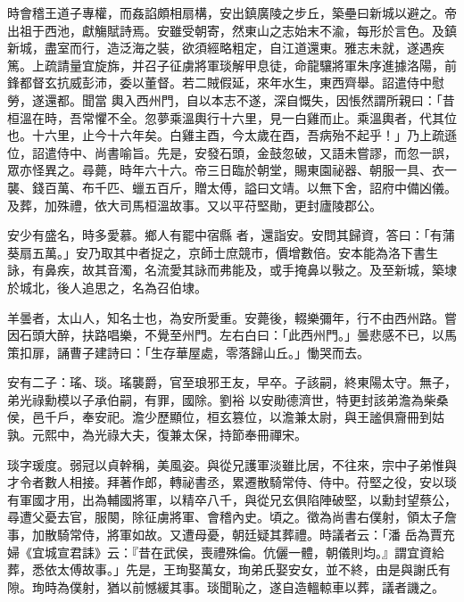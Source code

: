 \begin{pinyinscope}
 時會稽王道子專權，而姦諂頗相扇構，安出鎮廣陵之步丘，築壘曰新城以避之。帝出祖于西池，獻觴賦詩焉。安雖受朝寄，然東山之志始末不渝，每形於言色。及鎮新城，盡室而行，造泛海之裝，欲須經略粗定，自江道還東。雅志未就，遂遇疾篤。上疏請量宜旋旆，并召子征虜將軍琰解甲息徒，命龍驤將軍朱序進據洛陽，前鋒都督玄抗威彭沛，委以董督。若二賊假延，來年水生，東西齊舉。詔遣侍中慰勞，遂還都。聞當
 輿入西州門，自以本志不遂，深自慨失，因悵然謂所親曰：「昔桓溫在時，吾常懼不全。忽夢乘溫輿行十六里，見一白雞而止。乘溫輿者，代其位也。十六里，止今十六年矣。白雞主酉，今太歲在酉，吾病殆不起乎！」乃上疏遜位，詔遣侍中、尚書喻旨。先是，安發石頭，金鼓忽破，又語未嘗謬，而忽一誤，眾亦怪異之。尋薨，時年六十六。帝三日臨於朝堂，賜東園祕器、朝服一具、衣一襲、錢百萬、布千匹、蠟五百斤，贈太傅，謚曰文靖。以無下舍，詔府中備凶儀。及葬，加殊禮，依大司馬桓溫故事。又以平苻堅勛，更封廬陵郡公。



 安少有盛名，時多愛慕。鄉人有罷中宿縣
 者，還詣安。安問其歸資，答曰：「有蒲葵扇五萬。」安乃取其中者捉之，京師士庶競市，價增數倍。安本能為洛下書生詠，有鼻疾，故其音濁，名流愛其詠而弗能及，或手掩鼻以斅之。及至新城，築埭於城北，後人追思之，名為召伯埭。



 羊曇者，太山人，知名士也，為安所愛重。安薨後，輟樂彌年，行不由西州路。嘗因石頭大醉，扶路唱樂，不覺至州門。左右白曰：「此西州門。」曇悲感不已，以馬策扣扉，誦曹子建詩曰：「生存華屋處，零落歸山丘。」慟哭而去。



 安有二子：瑤、琰。瑤襲爵，官至琅邪王友，早卒。子該嗣，終東陽太守。無子，弟光祿勳模以子承伯嗣，有罪，國除。劉裕
 以安勛德濟世，特更封該弟澹為柴桑侯，邑千戶，奉安祀。澹少歷顯位，桓玄篡位，以澹兼太尉，與王謐俱齎冊到姑孰。元熙中，為光祿大夫，復兼太保，持節奉冊禪宋。



 琰字瑗度。弱冠以貞幹稱，美風姿。與從兄護軍淡雖比居，不往來，宗中子弟惟與才令者數人相接。拜著作郎，轉祕書丞，累遷散騎常侍、侍中。苻堅之役，安以琰有軍國才用，出為輔國將軍，以精卒八千，與從兄玄俱陷陣破堅，以勳封望蔡公，尋遭父憂去官，服闋，除征虜將軍、會稽內史。頃之。徵為尚書右僕射，領太子詹事，加散騎常侍，將軍如故。又遭母憂，朝廷疑其葬禮。時議者云：「潘
 岳為賈充婦《宜城宣君誄》云：『昔在武侯，喪禮殊倫。伉儷一體，朝儀則均。』謂宜資給葬，悉依太傅故事。」先是，王珣娶萬女，珣弟氏娶安女，並不終，由是與謝氏有隙。珣時為僕射，猶以前憾緩其事。琰聞恥之，遂自造轀輬車以葬，議者譏之。




\end{pinyinscope}
